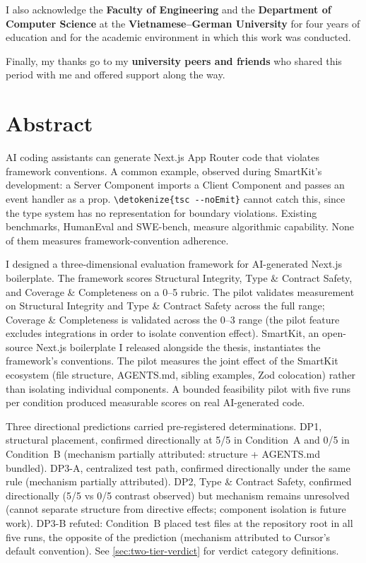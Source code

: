 \documentclass[12pt,a4paper]{report}
\newcommand{\code}[1]{\texttt{\nolinkurl{\detokenize{#1}}}}
\begin{document}
I also acknowledge the \textbf{Faculty of Engineering} and the \textbf{Department of Computer Science} at the \textbf{Vietnamese--German University} for four years of education and for the academic environment in which this work was conducted.

Finally, my thanks go to my \textbf{university peers and friends} who shared this period with me and offered support along the way.

\clearpage

\chapter*{Abstract}

AI coding assistants can generate Next.js App Router code that violates framework conventions. A common example, observed during SmartKit's development: a Server Component imports a Client Component and passes an event handler as a prop. \code{tsc --noEmit} cannot catch this, since the type system has no representation for boundary violations. Existing benchmarks, HumanEval and SWE-bench, measure algorithmic capability. None of them measures framework-convention adherence.

I designed a three-dimensional evaluation framework for AI-generated Next.js boilerplate. The framework scores Structural Integrity, Type \& Contract Safety, and Coverage \& Completeness on a 0--5 rubric. The pilot validates measurement on Structural Integrity and Type \& Contract Safety across the full range; Coverage \& Completeness is validated across the 0--3 range (the pilot feature excludes integrations in order to isolate convention effect). SmartKit, an open-source Next.js boilerplate I released alongside the thesis, instantiates the framework's conventions. The pilot measures the joint effect of the SmartKit ecosystem (file structure, AGENTS.md, sibling examples, Zod colocation) rather than isolating individual components. A bounded feasibility pilot with five runs per condition produced measurable scores on real AI-generated code.

Three directional predictions carried pre-registered determinations. DP1, structural placement, confirmed directionally at 5/5 in Condition~A and 0/5 in Condition~B (mechanism partially attributed: structure + AGENTS.md bundled). DP3-A, centralized test path, confirmed directionally under the same rule (mechanism partially attributed). DP2, Type \& Contract Safety, confirmed directionally (5/5 vs 0/5 contrast observed) but mechanism remains unresolved (cannot separate structure from directive effects; component isolation is future work). DP3-B refuted: Condition~B placed test files at the repository root in all five runs, the opposite of the prediction (mechanism attributed to Cursor's default convention). See \autoref{sec:two-tier-verdict} for verdict category definitions.
\end{document}
